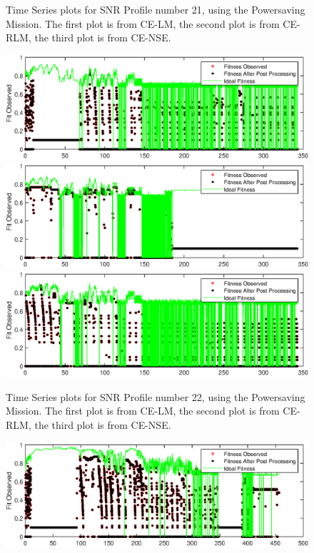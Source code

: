 \begin{appendices}
\begin{figure}[ht!]
\caption{Time Series plots for SNR Profile number 21, using the Powersaving Mission. The first plot is from CE-LM, the second plot is from CE-RLM, the third plot is from CE-NSE.}
\end{figure}
\begin{figure}[ht!]
\includegraphics{figures/c_sim_timeSeries/Fitness_timeSeries_LM_22.eps}
\includegraphics{figures/c_sim_timeSeries/Fitness_timeSeries_RLM_22.eps}
\includegraphics{figures/c_sim_timeSeries/Fitness_timeSeries_NSE_22.eps}
\caption{Time Series plots for SNR Profile number 22, using the Powersaving Mission. The first plot is from CE-LM, the second plot is from CE-RLM, the third plot is from CE-NSE.}
\end{figure}
\begin{figure}[ht!]
\includegraphics{figures/c_sim_timeSeries/Fitness_timeSeries_LM_23.eps}

\end{figure}
\end{appendices}
